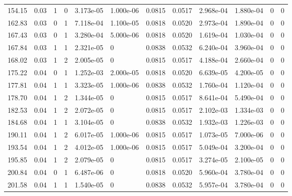 \documentclass[preview]{standalone}
\begin{document}
{{\begin{tabular}{L{1.2cm}C{1.2cm} C{0.3cm}C{0.5cm} C{1.4cm}C{1.4cm} C{1.4cm}C{1.4cm} C{1.6cm}C{1.6cm} C{1.6cm}C{1.6cm}}
  154.15  &  0.03  & 1     &  0 &  3.173e-05  & 1.000e-06  &  0.0815&   0.0517& 2.968e-04 & 1.880e-04   &  0 & 0  \\ 
  162.83  &  0.03  & 0     &  1 &  7.118e-04  & 1.100e-05  &  0.0818&   0.0520& 2.973e-04 & 1.890e-04   &  0 & 0  \\ 
  167.43  &  0.03  & 0     &  1 &  3.280e-04  & 5.000e-06  &  0.0818&   0.0520& 1.619e-04 & 1.030e-04   &  0 & 0  \\ 
  167.84  &  0.03  & 1     &  1 &  2.321e-05  & 0  &  0.0838&   0.0532& 6.240e-04 & 3.960e-04   &  0 & 0  \\ 
  168.02  &  0.03  & 1     &  2 &  2.005e-05  & 0  &  0.0815&   0.0517& 4.188e-04 & 2.660e-04   &  0 & 0  \\ 
  175.22  &  0.04  & 0     &  1 &  1.252e-03  & 2.000e-05  &  0.0818&   0.0520& 6.639e-05 & 4.200e-05   &  0 & 0  \\ 
  177.81  &  0.04  & 1     &  1 &  3.323e-05  & 1.000e-06  &  0.0838&   0.0532& 1.760e-04 & 1.120e-04   &  0 & 0  \\ 
  178.70  &  0.04  & 1     &  2 &  1.344e-05  & 0  &  0.0815&   0.0517& 8.641e-04 & 5.490e-04   &  0 & 0  \\ 
  182.53  &  0.04  & 1     &  2 &  2.072e-05  & 0  &  0.0815&   0.0517& 2.102e-03 & 1.334e-03   &  0 & 0  \\ 
  184.68  &  0.04  & 1     &  1 &  3.104e-05  & 0  &  0.0838&   0.0532& 1.932e-03 & 1.226e-03   &  0 & 0  \\ 
  190.11  &  0.04  & 1     &  2 &  6.017e-05  & 1.000e-06  &  0.0815&   0.0517& 1.073e-05 & 7.000e-06   &  0 & 0  \\ 
  193.54  &  0.04  & 1     &  2 &  4.012e-05  & 1.000e-06  &  0.0815&   0.0517& 5.049e-04 & 3.200e-04   &  0 & 0  \\ 
  195.85  &  0.04  & 1     &  2 &  2.079e-05  & 0  &  0.0815&   0.0517& 3.274e-05 & 2.100e-05   &  0 & 0  \\ 
  200.84  &  0.04  & 0     &  1 &  6.487e-06  & 0  &  0.0818&   0.0520& 5.960e-04 & 3.780e-04   &  0 & 0  \\ 
  201.58  &  0.04  & 1     &  1 &  1.540e-05  & 0  &  0.0838&   0.0532& 5.957e-04 & 3.780e-04   &  0 & 0  \\ 
\hline 
\end{tabular} 

}}
\end{document}
